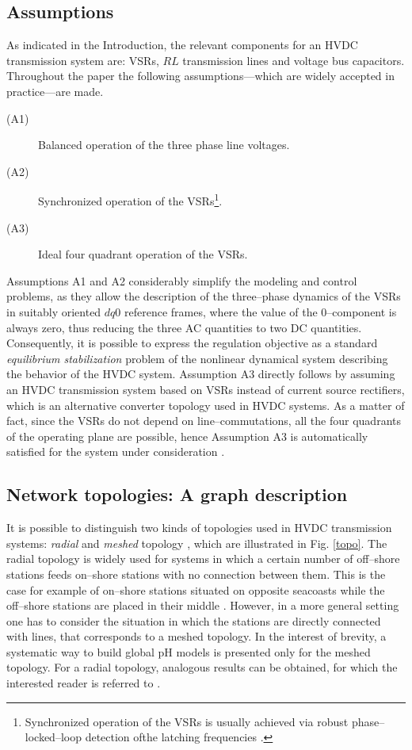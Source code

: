 \documentclass[5p,twocolumn]{elsarticle}
\def\begdes{\begin{description}}
\def\enddes{\end{description}}
\numberwithin{equation}{section}
\begin{document}
\subsection{Assumptions}
As indicated in the Introduction, the relevant components for an HVDC transmission system are: VSRs, $RL$ transmission lines and voltage bus capacitors.  Throughout the paper the
following assumptions---which are widely accepted in practice---are made.
\begdes
\item[(A1)] Balanced operation of the three phase line voltages.
\item[(A2)] Synchronized operation  of the VSRs\footnote{Synchronized operation  of the VSRs is usually achieved via robust phase--locked--loop detection ofthe latching frequencies \cite{iravani}.}.
\item[(A3)] Ideal four quadrant operation of the VSRs.
\enddes

Assumptions A1 and A2 considerably simplify the modeling and control problems, as they allow the description of the three--phase dynamics of the VSRs in suitably oriented $dq0$ reference frames, where the value
of the $0$--component is always zero, thus reducing the three AC quantities to two DC quantities. Consequently, it is possible to express the regulation objective as a standard {\em equilibrium stabilization}
problem of the nonlinear dynamical system describing the behavior of the HVDC system. Assumption A3 directly follows by assuming an HVDC transmission system based on VSRs instead of current source rectifiers,
which is an alternative converter topology used in HVDC systems. As a matter of fact, since the VSRs do not depend on line--commutations, all the four quadrants of the operating plane are possible, hence
Assumption A3 is automatically satisfied for the system under consideration  \cite{abbas}.

\subsection{Network topologies: A graph description}
It is possible to distinguish two kinds of topologies used in  HVDC transmission systems: \textit{radial} and \textit{meshed} topology \cite{agelidis,bucher,gomis}, which are illustrated in Fig. \ref{topo}. The
radial topology is widely used for systems in which a certain number of off--shore stations feeds on--shore stations with no connection between them. This is the case for example of on--shore stations situated
on opposite seacoasts while the off--shore stations are placed in their middle \cite{bucher,kirby}. However, in a more general setting one has to consider the situation in which the stations are directly connected with lines, that corresponds to a meshed topology. In the interest of brevity, a systematic
way to build global pH models is presented only for the {meshed} topology. For a {radial topology}, analogous results can be obtained, for which the interested reader is referred to \cite{ECCZonetti}.
\end{document}
